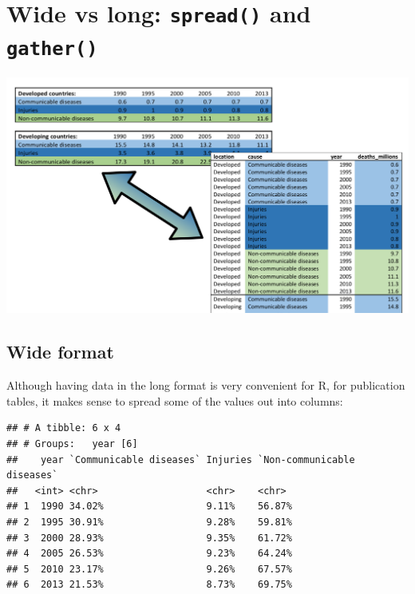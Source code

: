 \documentclass[12pt,]{krantz}
\makeatletter
\newenvironment{Shaded}{\begin{snugshade}}{\end{snugshade}}
\newcommand{\DataTypeTok}[1]{\textcolor[rgb]{0.13,0.29,0.53}{#1}}
\newcommand{\DecValTok}[1]{\textcolor[rgb]{0.00,0.00,0.81}{#1}}
\newcommand{\KeywordTok}[1]{\textcolor[rgb]{0.13,0.29,0.53}{\textbf{#1}}}
\newcommand{\NormalTok}[1]{#1}
\newcommand{\OperatorTok}[1]{\textcolor[rgb]{0.81,0.36,0.00}{\textbf{#1}}}
\newcommand{\StringTok}[1]{\textcolor[rgb]{0.31,0.60,0.02}{#1}}
\newenvironment{kframe}{%
\medskip{}
\setlength{\fboxsep}{.8em}
 \def\at@end@of@kframe{}%
 \ifinner\ifhmode%
  \def\at@end@of@kframe{\end{minipage}}%
  \begin{minipage}{\columnwidth}%
 \fi\fi%
 \def\FrameCommand##1{\hskip\@totalleftmargin \hskip-\fboxsep
 \colorbox{shadecolor}{##1}\hskip-\fboxsep
     \hskip-\linewidth \hskip-\@totalleftmargin \hskip\columnwidth}%
 \MakeFramed {\advance\hsize-\width
   \@totalleftmargin\z@ \linewidth\hsize
   \@setminipage}}%
 {\par\unskip\endMakeFramed%
 \at@end@of@kframe}
\renewenvironment{Shaded}{\begin{kframe}}{\end{kframe}}
\theoremstyle{definition}
\theoremstyle{definition}
\theoremstyle{definition}
\theoremstyle{remark}
\makeatother
\begin{document}
\hypertarget{wide-vs-long-spread-and-gather}{%
\section{\texorpdfstring{Wide vs long: \texttt{spread()} and
\texttt{gather()}}{Wide vs long: spread() and gather()}}\label{wide-vs-long-spread-and-gather}}

\includegraphics[width=40.46in]{images/wide_long}

\hypertarget{wide-format}{%
\subsection{Wide format}\label{wide-format}}

Although having data in the long format is very convenient for R, for
publication tables, it makes sense to spread some of the values out into
columns:

\begin{Shaded}
\end{Shaded}

\begin{verbatim}
## # A tibble: 6 x 4
## # Groups:   year [6]
##    year `Communicable diseases` Injuries `Non-communicable diseases`
##   <int> <chr>                   <chr>    <chr>                      
## 1  1990 34.02%                  9.11%    56.87%                     
## 2  1995 30.91%                  9.28%    59.81%                     
## 3  2000 28.93%                  9.35%    61.72%                     
## 4  2005 26.53%                  9.23%    64.24%                     
## 5  2010 23.17%                  9.26%    67.57%                     
## 6  2013 21.53%                  8.73%    69.75%
\end{verbatim}
\end{document}
